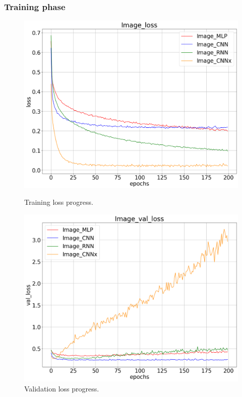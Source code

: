\subsubsection{Training phase}
\begin{figure}[!ht]
    \centering
    \begin{minipage}{0.48\textwidth}
        \centering
        \includegraphics[width=\linewidth]{obrazky-figures/Image_experiment/loss_2023-03-27_13:08:08.png}
        \caption{Training loss progress.}
        \label{graph-image-loss}
    \end{minipage}\hfill
    \begin{minipage}{0.48\textwidth}
        \centering
        \includegraphics[width=\linewidth]{obrazky-figures/Image_experiment/val_loss_2023-03-27_13:08:08.png}
        \caption{Validation loss progress.}
        \label{graph-image-val_loss}
    \end{minipage}
\end{figure}
